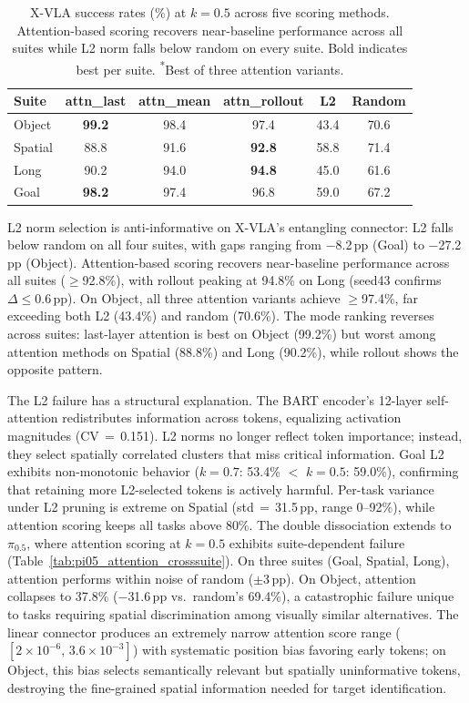 \begin{table}[h]
\centering
\small
\caption{X-VLA success rates (\%) at $k{=}0.5$ across five scoring methods. Attention-based scoring recovers near-baseline performance across all suites while L2 norm falls below random on every suite. Bold indicates best per suite. \textsuperscript{*}Best of three attention variants.}
\label{tab:attention_pruning}
\begin{tabular}{lccccc}
\toprule
Suite & attn\_last & attn\_mean & attn\_rollout & L2 & Random \\
\midrule
Object & \textbf{99.2} & 98.4 & 97.4 & 43.4 & 70.6 \\
Spatial & 88.8 & 91.6 & \textbf{92.8} & 58.8 & 71.4 \\
Long & 90.2 & 94.0 & \textbf{94.8} & 45.0 & 61.6 \\
Goal & \textbf{98.2} & 97.4 & 96.8 & 59.0 & 67.2 \\
\bottomrule
\end{tabular}
\end{table}

L2 norm selection is anti-informative on X-VLA's entangling connector: L2 falls below random on all four suites, with gaps ranging from $-$8.2\,pp (Goal) to $-$27.2\,pp (Object). Attention-based scoring recovers near-baseline performance across all suites (${\geq}$92.8\%), with rollout peaking at 94.8\% on Long (seed43 confirms $\Delta{\leq}$0.6\,pp). On Object, all three attention variants achieve ${\geq}$97.4\%, far exceeding both L2 (43.4\%) and random (70.6\%). The mode ranking reverses across suites: last-layer attention is best on Object (99.2\%) but worst among attention methods on Spatial (88.8\%) and Long (90.2\%), while rollout shows the opposite pattern.

The L2 failure has a structural explanation. The BART encoder's 12-layer self-attention redistributes information across tokens, equalizing activation magnitudes (CV$\,{=}\,$0.151). L2 norms no longer reflect token importance; instead, they select spatially correlated clusters that miss critical information. Goal L2 exhibits non-monotonic behavior ($k{=}0.7$: 53.4\% $<$ $k{=}0.5$: 59.0\%), confirming that retaining more L2-selected tokens is actively harmful. Per-task variance under L2 pruning is extreme on Spatial (std$\,{=}\,$31.5\,pp, range 0--92\%), while attention scoring keeps all tasks above 80\%. The double dissociation extends to $\pi_{0.5}$, where attention scoring at $k{=}0.5$ exhibits suite-dependent failure (Table~\ref{tab:pi05_attention_crosssuite}). On three suites (Goal, Spatial, Long), attention performs within noise of random ($\pm$3\,pp). On Object, attention collapses to 37.8\% ($-$31.6\,pp vs.\ random's 69.4\%), a catastrophic failure unique to tasks requiring spatial discrimination among visually similar alternatives. The linear connector produces an extremely narrow attention score range ($[2{\times}10^{-6},\, 3.6{\times}10^{-3}]$) with systematic position bias favoring early tokens; on Object, this bias selects semantically relevant but spatially uninformative tokens, destroying the fine-grained spatial information needed for target identification.

